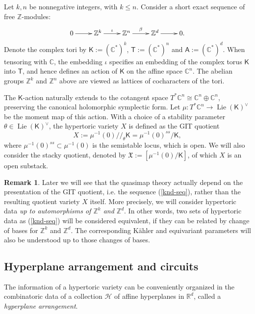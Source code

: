 \documentclass[10pt]{amsart}
\theoremstyle{definition}
\def\ZZ{{\mathbb{Z}}}
\def\RR{{\mathbb{R}}}
\def\CC{{\mathbb{C}}}
\newcommand{\cH}{\mathcal{H}}
\newcommand{\Lie}{\operatorname{Lie}}
\newcommand{\bA}{\mathsf{A}}
\newcommand{\bT}{\mathsf{T}}
\newcommand{\bK}{\mathsf{K}}
\theoremstyle{definition}
\newtheorem{Remark}[Definition]{Remark}
\numberwithin{equation}{section}
\theoremstyle{Theorem}
\begin{document}
Let $k,n$ be nonnegative integers, with $k\leq n$. Consider a short exact sequence of free $\ZZ$-modules:
\begin{equation} \label{knd-seq}
\xymatrix{
	0 \ar[r] & \ZZ^k \ar[r]^\iota & \ZZ^n \ar[r]^\beta & \ZZ^d \ar[r] & 0.
}
\end{equation}
Denote the complex tori by $\bK := (\CC^*)^k$, $\bT := (\CC^*)^n$ and $\bA := (\CC^*)^d$. When tensoring with $\CC$, the embedding $\iota$ specifies an embedding of the complex torus $\bK$ into $\bT$, and hence defines an action of $\bK$ on the affine space $\CC^n$. The abelian groups $\ZZ^k$ and $\ZZ^n$ above are viewed as lattices of cocharacters of the tori.

The $\bK$-action naturally extends to the cotangent space $T^* \CC^n \cong \CC^n \oplus \CC^n$, preserving the canonical holomorphic symplectic form. Let $\mu: T^* \CC^n \to \Lie(\bK)^\vee$ be the moment map of this action.  With a choice of a stability parameter $\theta \in \Lie(\bK)^\vee$, the hypertoric variety $X$ is defined as the GIT quotient
$$
X := \mu^{-1} (0) /\!/_\theta \bK = \mu^{-1} (0)^{ss} / \bK,
$$
where $\mu^{-1}(0)^{ss} \subset \mu^{-1} (0)$ is the semistable locus, which is open. 
We will also consider the stacky quotient, denoted by $\mathfrak{X} := [\mu^{-1} (0) / \bK ]$, of which $X$ is an open substack. 

\begin{Remark}
Later we will see that the quasimap theory actually depend on the presentation of the GIT quotient, i.e. the sequence (\ref{knd-seq}), rather than the resulting quotient variety $X$ itself. More precisely, we will consider hypertoric data \emph{up to automorphisms of $\ZZ^k$ and $\ZZ^d$}. In other words, two sets of hypertoric data as (\ref{knd-seq}) will be considered equivalent, if they can be related by change of bases for $\ZZ^k$ and $\ZZ^d$. The corresponding K\"ahler and equivariant parameters will also be understood up to those changes of bases.
\end{Remark}





\subsection{Hyperplane arrangement and circuits} \label{sec-hyper-arr}

The information of a hypertoric variety can be conveniently organized in the combinatoric data of a collection $\cH$ of affine hyperplanes in $\RR^d$, called a \emph{hyperplane arrangement}.
\end{document}
